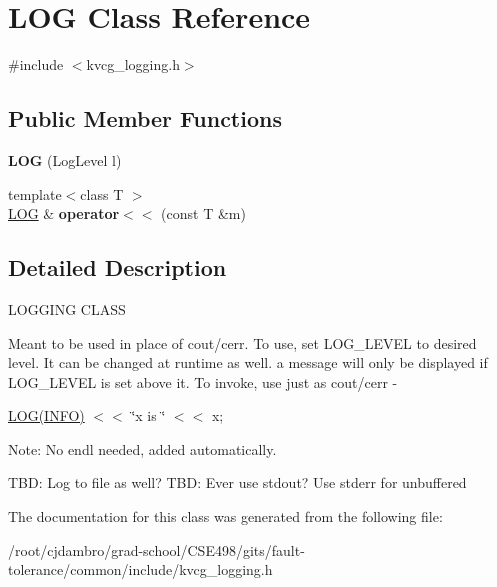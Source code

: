\hypertarget{classLOG}{\section{L\-O\-G Class Reference}
\label{classLOG}
}


{\ttfamily \#include $<$kvcg\-\_\-logging.\-h$>$}

\subsection*{Public Member Functions}
\begin{DoxyCompactItemize}
\item 
\hypertarget{classLOG_a04ef340e098cf005c9d951695e8915ef}{{\bfseries L\-O\-G} (Log\-Level l)}\label{classLOG_a04ef340e098cf005c9d951695e8915ef}

\item 
\hypertarget{classLOG_a4a612cfd4d81d244769483290e6147b0}{{\footnotesize template$<$class T $>$ }\\\hyperlink{classLOG}{L\-O\-G} \& {\bfseries operator$<$$<$} (const T \&m)}\label{classLOG_a4a612cfd4d81d244769483290e6147b0}

\end{DoxyCompactItemize}


\subsection{Detailed Description}
L\-O\-G\-G\-I\-N\-G C\-L\-A\-S\-S

Meant to be used in place of cout/cerr. To use, set L\-O\-G\-\_\-\-L\-E\-V\-E\-L to desired level. It can be changed at runtime as well. a message will only be displayed if L\-O\-G\-\_\-\-L\-E\-V\-E\-L is set above it. To invoke, use just as cout/cerr -\/

\hyperlink{classLOG}{L\-O\-G(\-I\-N\-F\-O)} $<$$<$ \char`\"{}x is \char`\"{} $<$$<$ x;

Note\-: No endl needed, added automatically.

T\-B\-D\-: Log to file as well? T\-B\-D\-: Ever use stdout? Use stderr for unbuffered 

The documentation for this class was generated from the following file\-:\begin{DoxyCompactItemize}
\item 
/root/cjdambro/grad-\/school/\-C\-S\-E498/gits/fault-\/tolerance/common/include/kvcg\-\_\-logging.\-h\end{DoxyCompactItemize}
